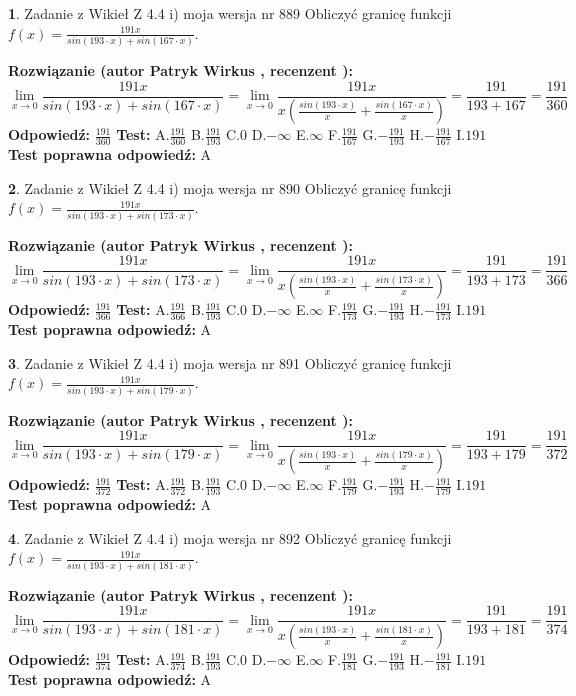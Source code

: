 \documentclass[12pt, a4paper]{article}
\theoremstyle{definition} %
\newtheorem{zad}{}
\newcommand{\zadStart}[1]{\begin{zad}#1\newline}
\newcommand{\zadStop}{\end{zad}}
\newcommand{\rozwStart}[2]{\noindent \textbf{Rozwiązanie (autor #1 , recenzent #2): }\newline}
\newcommand{\rozwStop}{\newline}
\newcommand{\odpStart}{\noindent \textbf{Odpowiedź:}\newline}
\newcommand{\odpStop}{\newline}
\newcommand{\testStart}{\noindent \textbf{Test:}\newline}
\newcommand{\testStop}{\newline}
\newcommand{\kluczStart}{\noindent \textbf{Test poprawna odpowiedź:}\newline}
\newcommand{\kluczStop}{\newline}
\begin{document}
\zadStart{Zadanie z Wikieł Z 4.4 i) moja wersja nr 889}
Obliczyć granicę funkcji $f(x)=\frac{191x}{sin(193\cdot x) +sin(167\cdot x)}$.
\zadStop
\rozwStart{Patryk Wirkus}{}
$$\lim\limits_{x\to 0}\frac{191x}{sin(193\cdot x) +sin(167\cdot x)}=\lim\limits_{x\to 0}\frac{191x}{x(\frac{sin(193\cdot x)}{x}+\frac{sin(167\cdot x)}{x})}=\frac{191}{193+167} = \frac{191}{360}$$
\rozwStop
\odpStart
$\frac{191}{360}$
\odpStop
\testStart
A.$\frac{191}{360}$
B.$\frac{191}{193}$
C.$0$
D.$-\infty$
E.$\infty$
F.$\frac{191}{167}$
G.$-\frac{191}{193}$
H.$-\frac{191}{167}$
I.$191$
\testStop
\kluczStart
A
\kluczStop



\zadStart{Zadanie z Wikieł Z 4.4 i) moja wersja nr 890}
Obliczyć granicę funkcji $f(x)=\frac{191x}{sin(193\cdot x) +sin(173\cdot x)}$.
\zadStop
\rozwStart{Patryk Wirkus}{}
$$\lim\limits_{x\to 0}\frac{191x}{sin(193\cdot x) +sin(173\cdot x)}=\lim\limits_{x\to 0}\frac{191x}{x(\frac{sin(193\cdot x)}{x}+\frac{sin(173\cdot x)}{x})}=\frac{191}{193+173} = \frac{191}{366}$$
\rozwStop
\odpStart
$\frac{191}{366}$
\odpStop
\testStart
A.$\frac{191}{366}$
B.$\frac{191}{193}$
C.$0$
D.$-\infty$
E.$\infty$
F.$\frac{191}{173}$
G.$-\frac{191}{193}$
H.$-\frac{191}{173}$
I.$191$
\testStop
\kluczStart
A
\kluczStop



\zadStart{Zadanie z Wikieł Z 4.4 i) moja wersja nr 891}
Obliczyć granicę funkcji $f(x)=\frac{191x}{sin(193\cdot x) +sin(179\cdot x)}$.
\zadStop
\rozwStart{Patryk Wirkus}{}
$$\lim\limits_{x\to 0}\frac{191x}{sin(193\cdot x) +sin(179\cdot x)}=\lim\limits_{x\to 0}\frac{191x}{x(\frac{sin(193\cdot x)}{x}+\frac{sin(179\cdot x)}{x})}=\frac{191}{193+179} = \frac{191}{372}$$
\rozwStop
\odpStart
$\frac{191}{372}$
\odpStop
\testStart
A.$\frac{191}{372}$
B.$\frac{191}{193}$
C.$0$
D.$-\infty$
E.$\infty$
F.$\frac{191}{179}$
G.$-\frac{191}{193}$
H.$-\frac{191}{179}$
I.$191$
\testStop
\kluczStart
A
\kluczStop



\zadStart{Zadanie z Wikieł Z 4.4 i) moja wersja nr 892}
Obliczyć granicę funkcji $f(x)=\frac{191x}{sin(193\cdot x) +sin(181\cdot x)}$.
\zadStop
\rozwStart{Patryk Wirkus}{}
$$\lim\limits_{x\to 0}\frac{191x}{sin(193\cdot x) +sin(181\cdot x)}=\lim\limits_{x\to 0}\frac{191x}{x(\frac{sin(193\cdot x)}{x}+\frac{sin(181\cdot x)}{x})}=\frac{191}{193+181} = \frac{191}{374}$$
\rozwStop
\odpStart
$\frac{191}{374}$
\odpStop
\testStart
A.$\frac{191}{374}$
B.$\frac{191}{193}$
C.$0$
D.$-\infty$
E.$\infty$
F.$\frac{191}{181}$
G.$-\frac{191}{193}$
H.$-\frac{191}{181}$
I.$191$
\testStop
\kluczStart
A
\kluczStop
\end{document}
